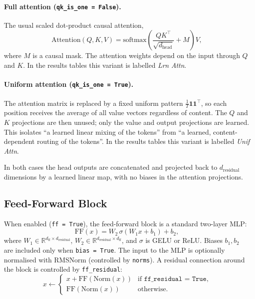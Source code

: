 \documentclass[11pt,a4paper]{article}
\begin{document}
\paragraph{Full attention (\texttt{qk\_is\_one = False}).}
The usual scaled dot-product causal attention,
\[
    \text{Attention}(Q, K, V) = \text{softmax}\!\left(\frac{QK^\top}{\sqrt{d_\text{head}}} + M\right) V,
\]
where $M$ is a causal mask. The attention weights depend on the input through $Q$ and $K$. In the results tables this variant is labelled \emph{Lrn Attn}.

\paragraph{Uniform attention (\texttt{qk\_is\_one = True}).}
The attention matrix is replaced by a fixed uniform pattern $\tfrac{1}{T}\mathbf{1}\mathbf{1}^\top$, so each position receives the average of all value vectors regardless of content. The $Q$ and $K$ projections are then unused; only the value and output projections are learned. This isolates ``a learned linear mixing of the tokens'' from ``a learned, content-dependent routing of the tokens''. In the results tables this variant is labelled \emph{Unif Attn}.

In both cases the head outputs are concatenated and projected back to $d_\text{residual}$ dimensions by a learned linear map, with no biases in the attention projections.

\subsection{Feed-Forward Block}
\label{sec:ff}

When enabled (\texttt{ff = True}), the feed-forward block is a standard two-layer MLP:
\[
    \text{FF}(x) = W_2\, \sigma\!\left(W_1 x + b_1\right) + b_2,
\]
where $W_1 \in \mathbb{R}^{d_\text{ff} \times d_\text{residual}}$, $W_2 \in \mathbb{R}^{d_\text{residual} \times d_\text{ff}}$, and $\sigma$ is GELU or ReLU. Biases $b_1, b_2$ are included only when \texttt{bias = True}. The input to the MLP is optionally normalised with RMSNorm (controlled by \texttt{norms}). A residual connection around the block is controlled by \texttt{ff\_residual}:
\[
    x \leftarrow
    \begin{cases}
        x + \text{FF}(\text{Norm}(x)) & \text{if } \texttt{ff\_residual = True},\\
        \text{FF}(\text{Norm}(x)) & \text{otherwise}.
    \end{cases}
\]
\end{document}

